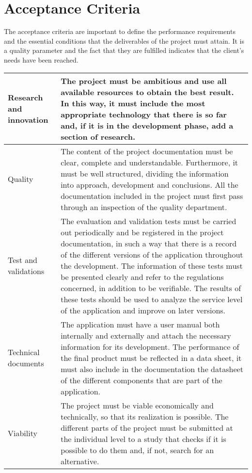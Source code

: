 \section{Acceptance Criteria}

The acceptance criteria are important to define the performance requirements and the essential conditions that the deliverables of the project must attain. It is a quality parameter and the fact that they are fulfilled indicates that the client's needs have been reached.

\begin{center}
	\begin{longtable}{|p{2cm}|p{10cm}|}
		\hline 
		Research and innovation & The project must be ambitious and use all available resources to obtain the best result. In this way, it must include the most appropriate technology that there is so far and, if it is in the development phase, add a section of research. 
		\\ 
		\hline 
		Quality & The content of the project documentation must be clear, complete and understandable. Furthermore, it must be well structured, dividing the information into approach, development and conclusions.
		All the documentation included in the project must first pass through an inspection of the quality department. 
		\\ 
		\hline 
		Test and validations & The evaluation and validation tests must be carried out periodically and be registered in the project documentation, in such a way that there is a record of the different versions of the application throughout the development.
		The information of these tests must be presented clearly and refer to the regulations concerned, in addition to be verifiable.
		The results of these tests should be used to analyze the service level of the application and improve on later versions.
		\\ 
		\hline 
		Technical documents & The application must have a user manual both internally and externally and attach the necessary information for its development.
		The performance of the final product must be reflected in a data sheet, it must also include in the documentation the datasheet of the different components that are part of the application.
		\\ 
		\hline
		Viability & The project must be viable economically and technically, so that its realization is possible.
		The different parts of the project must be submitted at the individual level to a study that checks if it is possible to do them and, if not, search for an alternative.

\end{longtable}
\end{center}
